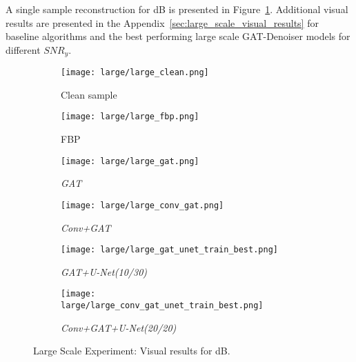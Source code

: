 A single sample reconstruction for  dB is presented in Figure~\ref{fig:large_scale_best_reco}.
Additional visual results are presented in the Appendix~\ref{sec:large_scale_visual_results} for baseline algorithms 
and the best performing large scale GAT-Denoiser models for different $\textit{SNR}_y$. 

\begin{figure}[H]
  \captionsetup[subfigure]{justification=centering}
  \centering
  \begin{subfigure}[t]{0.16\textwidth}
    \texttt{[image: large/large\_clean.png]}
    \caption{Clean sample}
  \end{subfigure}
  \begin{subfigure}[t]{0.16\textwidth}
    \texttt{[image: large/large\_fbp.png]}
    \caption{FBP}
  \end{subfigure}
  \begin{subfigure}[t]{0.16\textwidth}
    \texttt{[image: large/large\_gat.png]}
    \caption{\textit{GAT}}
  \end{subfigure}
  \begin{subfigure}[t]{0.16\textwidth}
    \texttt{[image: large/large\_conv\_gat.png]}
    \caption{\textit{Conv+GAT}}
  \end{subfigure}
  \begin{subfigure}[t]{0.16\textwidth}
    \texttt{[image: large/large\_gat\_unet\_train\_best.png]}
    \caption{\textit{GAT+U-Net(10/30)}}
  \end{subfigure}
  \begin{subfigure}[t]{0.16\textwidth}
    \texttt{[image: large/large\_conv\_gat\_unet\_train\_best.png]}
    \caption{\textit{Conv+GAT+U-Net(20/20)}}
  \end{subfigure}
  \caption{Large Scale Experiment: Visual results for  dB.}
  \label{fig:large_scale_best_reco}
\end{figure}

